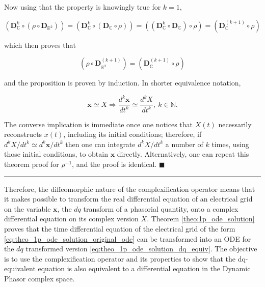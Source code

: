 	Now using that the property is knowingly true for $k=1$,

\begin{equation} \left( \mathbf{D}^k_\mathbb{C}\circ \left(\rho\circ \mathbf{D}_{\mathbb{R}^2}\right)\right) = \left( \mathbf{D}^k_\mathbb{C}\circ \left(\mathbf{D}_\mathbb{C}\circ\rho\right)\right) = \left(\left( \mathbf{D}^k_\mathbb{C}\circ \mathbf{D}_\mathbb{C}\right)\circ\rho\right) = \left( \mathbf{D}^{\left(k+1\right)}_\mathbb{C}\circ\rho\right) \end{equation}

	\noindent which then proves that

\begin{equation} \left(\rho\circ \mathbf{D}^{\left(k+1\right)}_{\mathbb{R}^2}\right) = \left( \mathbf{D}^{\left(k+1\right)}_\mathbb{C}\circ\rho\right) \end{equation} 

	\noindent and the proposition is proven by induction. In shorter equivalence notation,

\begin{equation} \mathbf{x} \simeq X \Rightarrow \dfrac{d^k\mathbf{x}}{dt^k} \simeq \dfrac{d^kX}{dt^k},\ k\in\mathbb{N}. \end{equation}

	The converse implication is immediate once one notices that $X(t)$ necessarily reconstructs $x(t)$, including its initial conditions; therefore, if $d^kX/dt^k \simeq d^k\mathbf{x}/dt^k$ then one can integrate $d^kX/dt^k$ a number of $k$ times, using those initial conditions, to obtain $\mathbf{x}$ directly. Alternatively, one can repeat this theorem proof for $\rho^{-1}$, and the proof is identical. \hfill$\blacksquare$

\vspace{5mm}
\hrule
\vspace{5mm} %

	Therefore, the diffeomorphic nature of the complexification operator means that it makes possible to transform the real differential equation of an electrical grid on the variable $\mathbf{x}$, the $dq$ transform of a phasorial quantity, onto a complex differential equation on its complex version $X$. Theorem \eqref{theo:1p_ode_solution} proves that the time differential equation of the electrical grid of the form \eqref{eq:theo_1p_ode_solution_original_ode} can be transformed into an ODE for the $dq$ transformed version \eqref{eq:theo_1p_ode_solution_dq_equiv}. The objective is to use the complexification operator and its properties to show that the dq-equivalent equation is also equivalent to a differential equation in the Dynamic Phasor complex space.

